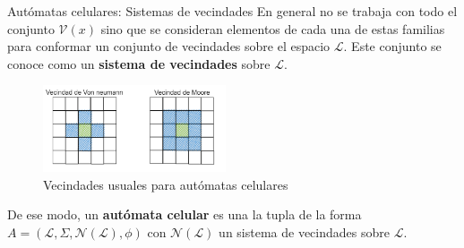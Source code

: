 \documentclass[9pt]{beamer}
\begin{document}
    
    
    

\begin{frame}{Autómatas celulares: Sistemas de vecindades}
En general no se trabaja con todo el conjunto $\mathcal{V}(x)$ sino que se consideran elementos de cada una de estas familias para conformar un conjunto de vecindades sobre el espacio $\mathcal{L}$. Este conjunto se conoce como un \textbf{sistema de vecindades} sobre $\mathcal{L}$.

\begin{figure}[h]
  \centering
    \includegraphics[width=0.48\textwidth]{Imagenes/vecindades.PNG}
  \caption{Vecindades usuales para autómatas celulares}
  \label{fig:Moore - Von neumann}
\end{figure}    

De ese modo, un \textbf{autómata celular} es una la tupla de la forma  $A=(\mathcal{L},\Sigma,\mathcal{N}(\mathcal{L}),\phi)$ con $\mathcal{N}(\mathcal{L})$ un sistema de vecindades sobre $\mathcal{L}$.
\end{frame}
\end{document}
